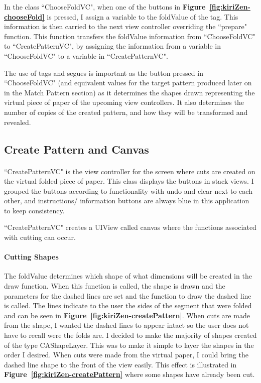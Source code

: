 \documentclass[11pt]{article}
\begin{document}
            In the class ``ChooseFoldVC", when one of the buttons in \textbf{Figure~\ref{fig:kiriZen-chooseFold}} is pressed, I assign a variable to the foldValue of the tag. This information is then carried to the next view controller overriding the ``prepare" function. This function transfers the foldValue information from ``ChooseFoldVC" to ``CreatePatternVC", by assigning the information from a variable in ``ChooseFoldVC" to a variable in ``CreatePatternVC".
                    
            The use of tags and segues is important as the button pressed in ``ChooseFoldVC" (and equivalent values for the target pattern produced later on in the Match Pattern section) as it determines the shapes drawn representing the virtual piece of paper of the upcoming view controllers. It also determines the number of copies of the created pattern, and how they will be transformed and revealed.
            
                
            \subsection{Create Pattern and Canvas}
                \paragraph{}
                ``CreatePatternVC" is the view controller for the screen where cuts are created on the virtual folded piece of paper. This class displays the buttons in stack views. I grouped the buttons according to functionality with undo and clear next to each other, and instructions/ information buttons are always blue in this application to keep consistency. 
                
                ``CreatePatternVC" creates a UIView called canvas where the functions associated with cutting can occur.
                    
                 \paragraph{Cutting Shapes}
                 The foldValue determines which shape of what dimensions will be created in the draw function. When this function is called, the shape is drawn and the parameters for the dashed lines are set and the function to draw the dashed line is called. The lines indicate to the user the sides of the segment that were folded and can be seen in \textbf{Figure~\ref{fig:kiriZen-createPattern}}.
                 When cuts are made from the shape, I wanted the dashed lines to appear intact so the user does not have to recall were the folds are. I decided to make the majority of shapes created of the type CAShapeLayer. This was to make it simple to layer the shapes in the order I desired. When cuts were made from the virtual paper, I could bring the dashed line shape to the front of the view easily. This effect is illustrated in \textbf{Figure~\ref{fig:kiriZen-createPattern}} where some shapes have already been cut.
                 
\end{document}

